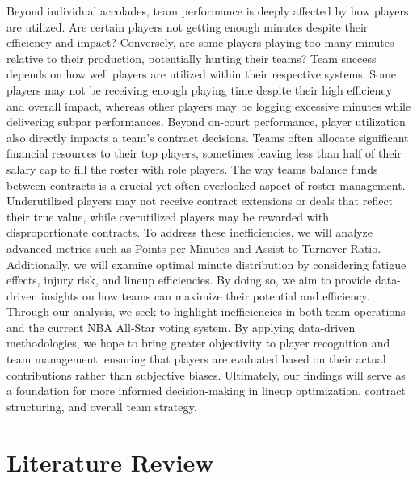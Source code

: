 \documentclass[12pt]{article}
\begin{document}
Beyond individual accolades, team performance is deeply affected by how players are utilized. Are certain players not getting enough minutes despite their efficiency and impact? Conversely, are some players playing too many minutes relative to their production, potentially hurting their teams? Team success depends on how well players are utilized within their respective systems. Some players may not be receiving enough playing time despite their high efficiency and overall impact, whereas other players may be logging excessive minutes while delivering subpar performances. Beyond on-court performance, player utilization also directly impacts a team’s contract decisions. Teams often allocate significant financial resources to their top players, sometimes leaving less than half of their salary cap to fill the roster with role players. The way teams balance funds between contracts is a crucial yet often overlooked aspect of roster management. Underutilized players may not receive contract extensions or deals that reflect their true value, while overutilized players may be rewarded with disproportionate contracts.
To address these inefficiencies, we will analyze advanced metrics such as Points per Minutes and Assist-to-Turnover Ratio. Additionally, we will examine optimal minute distribution by considering fatigue effects, injury risk, and lineup efficiencies. By doing so, we aim to provide data-driven insights on how teams can maximize their potential and efficiency.
Through our analysis, we seek to highlight inefficiencies in both team operations and the current NBA All-Star voting system. By applying data-driven methodologies, we hope to bring greater objectivity to player recognition and team management, ensuring that players are evaluated based on their actual contributions rather than subjective biases. Ultimately, our findings will serve as a foundation for more informed decision-making in lineup optimization, contract structuring, and overall team strategy.

\section{Literature Review}
\end{document}
